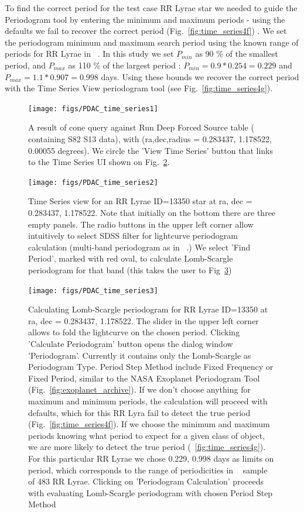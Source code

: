 \documentclass[DM,lsstdraft,toc,usenatbib]{lsstdoc}
\begin{document}
To find the correct period for the test case RR Lyrae star we needed to guide the Periodogram tool by entering the minimum and maximum periods - using the defaults we fail to recover the correct period  (Fig.~\ref{fig:time_series4f}) .  We set the periodogram minimum and maximum search period using the known  range of periods for RR Lyrae in ~\cite{sesar2010}.  In this study we set  $P_{min}$ as 90 \% of the smallest period, and $P_{max}$ as 110 \% of the largest period :  $P_{min} = 0.9 * 0.254 = 0.229 $ and  $P_{max} = 1.1 * 0.907 = 0.998 $ days.  Using these bounds we recover the correct period with the Time Series View periodogram tool (see Fig.~\ref{fig:time_series4g}). 



\begin{figure}
\texttt{[image: figs/PDAC\_time\_series1]}
\caption{A result of cone query against Run Deep Forced Source table ( containing S82 S13 data), with (ra,dec,radius = 0.283437, 1.178522, 0.00055 degrees). We circle the 'View Time Series' button that links to the Time Series UI  shown on Fig.~\ref{fig:time_series2}. }
\label{fig:time_series1}
\end{figure}

\begin{figure}
\texttt{[image: figs/PDAC\_time\_series2]}
\caption{Time Series view for an RR Lyrae ID=13350 star at ra, dec = 0.283437\degree, 1.178522\degree . Note that initially on the bottom there are three empty panels. The radio buttons in the upper left corner allow intuitively to select SDSS filter for lightcurve periodogram calculation (multi-band periodogram as in ~\citep{vanderplas2015}.) We select 'Find Period', marked with red oval, to calculate Lomb-Scargle periodogram for that band (this takes the user to Fig~\ref{fig:time_series3}) }
\label{fig:time_series2}
\end{figure}


\begin{figure}
\texttt{[image: figs/PDAC\_time\_series3]}
\caption{Calculating Lomb-Scargle periodogram for RR Lyrae ID=13350 at  ra, dec = 0.283437\degree, 1.178522\degree . The slider in the upper left corner allows to fold the lightcurve on the chosen period. Clicking 'Calculate Periodogram' button opens the dialog window 'Periodogram'. Currently it contains only the Lomb-Scargle as Periodogram Type. Period Step Method include Fixed Frequency or Fixed Period, similar to the NASA Exoplanet Periodogram Tool (Fig.~\ref{fig:exoplanet_archive}). If we don't choose anything for maximum and minimum periods, the calculation will proceed with defaults, which for this RR Lyra fail  to detect the true period (Fig.~\ref{fig:time_series4f}). If we choose the minimum and maximum periods knowing what period to expect for a given class of object, we are more likely to detect the true period (~\ref{fig:time_series4g}). For this particular RR Lyrae we chose 0.229, 0.998 days as limits  on period, which corresponds to the range of periodicities in ~\citep{sesar2010} sample of 483 RR Lyrae.   Clicking on 'Periodogram Calculation' proceeds with evaluating Lomb-Scargle periodogram with chosen Period Step Method }
\label{fig:time_series3}
\end{figure}
\end{document}
